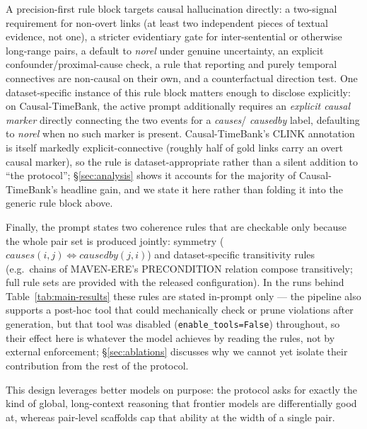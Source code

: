 \documentclass[11pt]{article}
\begin{document}
A precision-first rule block targets causal hallucination directly: a two-signal
requirement for non-overt links (at least two independent pieces of textual
evidence, not one), a stricter evidentiary gate for inter-sentential or otherwise
long-range pairs, a default to \textit{norel} under genuine uncertainty, an
explicit confounder/proximal-cause check, a rule that reporting and purely temporal
connectives are non-causal on their own, and a counterfactual direction test. One
dataset-specific instance of this rule block matters enough to disclose explicitly:
on Causal-TimeBank, the active prompt additionally requires an \emph{explicit
causal marker} directly connecting the two events for a \textit{causes}/
\textit{causedby} label, defaulting to \textit{norel} when no such marker is
present. Causal-TimeBank's CLINK annotation is itself markedly explicit-connective
(roughly half of gold links carry an overt causal marker), so the rule is
dataset-appropriate rather than a silent addition to ``the protocol''; \S\ref{sec:analysis}
shows it accounts for the majority of Causal-TimeBank's headline gain, and we state
it here rather than folding it into the generic rule block above.

Finally, the prompt states two coherence rules that are checkable only because the
whole pair set is produced jointly: symmetry
($\textit{causes}(i,j) \Leftrightarrow \textit{causedby}(j,i)$) and
dataset-specific transitivity rules (e.g.\ chains of MAVEN-ERE's
\textsc{PRECONDITION} relation compose transitively; full rule sets are provided
with the released configuration). In the runs behind Table~\ref{tab:main-results}
these rules are stated in-prompt only --- the pipeline also supports a post-hoc
tool that could mechanically check or prune violations after generation, but that
tool was disabled (\texttt{enable\_tools=False}) throughout, so their effect here
is whatever the model achieves by reading the rules, not by external enforcement;
\S\ref{sec:ablations} discusses why we cannot yet isolate their contribution from
the rest of the protocol.

This design leverages better models on purpose: the protocol asks for exactly the
kind of global, long-context reasoning that frontier models are differentially good
at, whereas pair-level scaffolds cap that ability at the width of a single pair.
\end{document}
